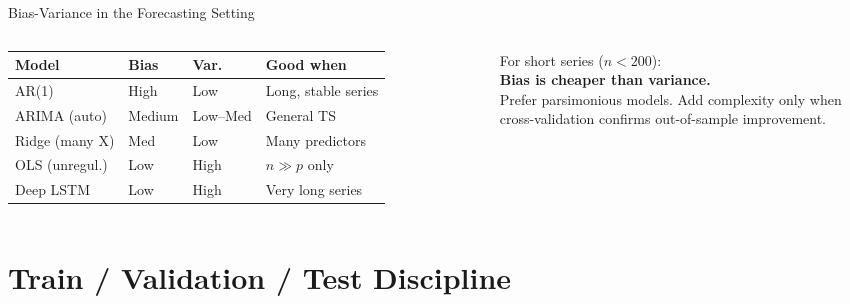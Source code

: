 \documentclass[aspectratio=169, 11pt]{beamer}
\begin{document}
\begin{frame}{Bias-Variance in the Forecasting Setting}
  \begin{columns}[T]
      {\footnotesize
      \begin{tabular}{lllp{2.0cm}}
        \toprule
        \textbf{Model} & \textbf{Bias} & \textbf{Var.}
                       & \textbf{Good when} \\
        \midrule
        AR(1)           & High   & Low     & Long, stable series \\
        ARIMA (auto)    & Medium & Low--Med & General TS \\
        Ridge (many X)  & Med    & Low     & Many predictors \\
        OLS (unregul.)  & Low    & High    & $n \gg p$ only \\
        Deep LSTM       & Low    & High    & Very long series \\
        \bottomrule
      \end{tabular}
      }
      \begin{keybox}
        {\small For short series ($n < 200$):\\[2pt]
        \textbf{Bias is cheaper than variance.}\\[2pt]
        Prefer parsimonious models.
        Add complexity only when
        cross-validation confirms
        out-of-sample improvement.}
      \end{keybox}
  \end{columns}
\end{frame}

\section{Train / Validation / Test Discipline}

\end{document}
